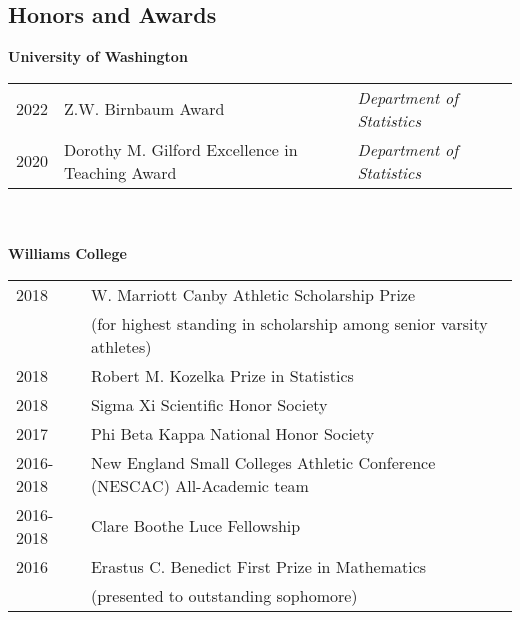 \documentclass[margin, 10pt]{res} %
\begin{document}
\begin{resume}
{%

\section{Honors and Awards}
\textbf{University of Washington} \\
\begin{tabular}{l l l}
2022 & Z.W. Birnbaum Award & \emph{Department of Statistics} \\
2020 & Dorothy M. Gilford Excellence in Teaching Award & \emph{Department of Statistics}
\end{tabular}  \\
\\
\textbf{Williams College} \\
\begin{tabular}{l l }
2018 & W. Marriott Canby Athletic Scholarship Prize   \\
& (for highest standing in scholarship among senior varsity athletes) \\
2018 & Robert M. Kozelka Prize in Statistics   \\
2018&  Sigma Xi Scientific Honor Society \\
2017 & Phi Beta Kappa  National Honor Society \\
2016-2018 & New England Small Colleges Athletic Conference (NESCAC) All-Academic team \\
2016-2018 & Clare Boothe Luce Fellowship \\
2016 & Erastus C. Benedict First Prize in Mathematics \\
& (presented to outstanding sophomore) \\
\end{tabular}

}
\end{resume}
\end{document}
